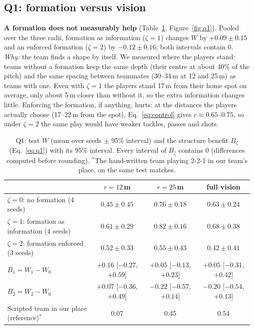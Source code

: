 \documentclass{article}
\begin{document}
\subsection{Q1: formation versus vision}
\label{sec:q1}


\textbf{A formation does not measurably help} (Table~\ref{tab:q1}, Figure~\ref{fig:q1}). Pooled over the three radii,
formation as information ($\zeta=1$) changes $W$ by $+0.09\pm0.15$ and an enforced formation ($\zeta=2$) by
$-0.12\pm0.16$; both intervals contain 0. \emph{Why:} the team finds a shape by itself. We measured where the players
stand: teams without a formation keep the same depth (their centre at about 40\% of the pitch) and the same spacing
between teammates (30--34\,m at 12 and 25\,m) as teams with one. Even with $\zeta=1$ the players stand 17\,m from their home spot on
average, only about 5\,m closer than without it, so the extra information changes little. Enforcing the formation, if
anything, hurts: at the distances the players actually choose (17--22\,m from the spot), Eq.~\eqref{eq:control} gives
$c\approx0.65$--$0.75$, so under $\zeta=2$ the same play would have weaker tackles, passes and shots.

\begin{table}[H]
\caption{Q1: test $W$ (mean over seeds $\pm$ 95\% interval) and the structure benefit $B_\zeta$ (Eq.~\ref{eq:q1}) with
its 95\% interval. Every interval of $B_\zeta$ contains 0 (differences computed before rounding). $^*$The hand-written team playing 2-2-1 in our team's
place, on the same test matches.}
\label{tab:q1}
\centering
\small
\begin{tabular}{lccc}
\toprule
 & $r=12$\,m & $r=25$\,m & full vision \\
\midrule
$\zeta=0$: no formation (4 seeds) & $0.45\pm0.45$ & $0.76\pm0.18$ & $0.63\pm0.24$ \\
$\zeta=1$: formation as information (4 seeds) & $0.61\pm0.29$ & $0.82\pm0.16$ & $0.68\pm0.38$ \\
$\zeta=2$: formation enforced (3 seeds) & $0.52\pm0.33$ & $0.55\pm0.43$ & $0.42\pm0.41$ \\
\midrule
$B_1=W_1-W_0$ & $+0.16$ [$-0.27$, $+0.59$] & $+0.05$ [$-0.13$, $+0.23$] & $+0.05$ [$-0.31$, $+0.42$] \\
$B_2=W_2-W_0$ & $+0.07$ [$-0.36$, $+0.49$] & $-0.22$ [$-0.57$, $+0.14$] & $-0.20$ [$-0.54$, $+0.13$] \\
\midrule
Scripted team in our place (reference)$^*$ & 0.07 & 0.45 & 0.54 \\
\bottomrule
\end{tabular}
\end{table}
\end{document}
